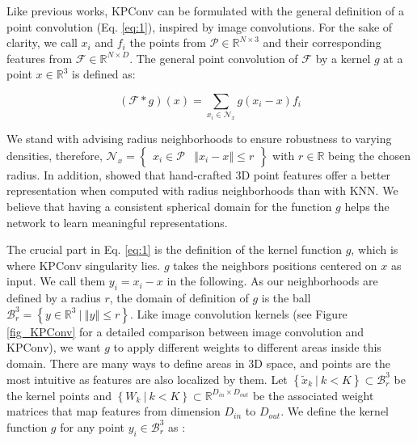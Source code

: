 \documentclass[10pt,twocolumn,letterpaper]{article}
\begin{document}
Like previous works, KPConv can be formulated with the general definition of a point convolution (Eq. \ref{eq:1}), inspired by image convolutions. For the sake of clarity, we call $x_i$ and $f_i$ the points from $\mathcal{P} \in \mathbb{R}^{N \times 3}$ and their corresponding features from $\mathcal{F} \in \mathbb{R}^{N \times D}$. The general point convolution of $\mathcal{F}$ by a kernel $g$ at a point $x \in \mathbb{R}^3$ is defined as:

\begin{equation} \label{eq:1}
    (\mathcal{F}*g)(x) = \sum_{x_i \in \mathcal{N}_x} g(x_i-x)f_i
\end{equation}

We stand with \cite{hermosilla2018monte} advising radius neighborhoods to ensure robustness to varying densities, therefore, $\mathcal{N}_x = 
    \left\lbrace
        \begin{array}{c|c}  
            x_i \in \mathcal{P} &  \left\Vert x_i - x \right\Vert \leqslant r 
        \end{array} 
    \right\rbrace$ with $r \in \mathbb{R}$ being the chosen radius. In addition, \cite{thomas2018semantic} showed that hand-crafted 3D point features offer a better representation when computed with radius neighborhoods than with KNN. We believe that having a consistent spherical domain for the function $g$ helps the network to learn meaningful representations. 
    
The crucial part in Eq. \ref{eq:1} is the definition of the kernel function $g$, which is where KPConv singularity lies. $g$ takes the neighbors positions centered on $x$ as input. We call them $y_i = x_i - x$ in the following. As our neighborhoods are defined by a radius $r$, the domain of definition of $g$ is the ball $\mathcal{B}_r^3 = \left\lbrace y \in \mathbb{R}^3  \: | \: \left\Vert y \right\Vert \leqslant r \right\rbrace$. Like image convolution kernels (see Figure \ref{fig_KPConv} for a detailed comparison between image convolution and KPConv), we want $g$ to apply different weights to different areas inside this domain. There are many ways to define areas in 3D space, and points are the most intuitive as features are also localized by them. Let $\left\lbrace \widetilde{x}_k \: | \: k < K \right\rbrace \subset \mathcal{B}_r^3$ be the kernel points and $\left\lbrace W_k \: | \: k < K \right\rbrace \subset \mathbb{R}^{D_{in} \times D_{out}}$ be the associated weight matrices that map features from dimension $D_{in}$ to $D_{out}$. We define the kernel function $g$ for any point $y_i\in\mathcal{B}_r^3$ as :
\end{document}
